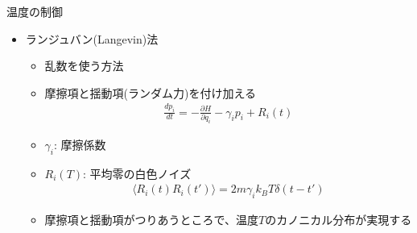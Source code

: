 
\begin{frame}[t,fragile]{温度の制御}
  \begin{itemize}
  \item ランジュバン(Langevin)法
    \begin{itemize}
    \item 乱数を使う方法
    \item 摩擦項と揺動項(ランダム力)を付け加える
      \begin{align*}
        \frac{dp_i}{dt} = - \frac{\partial H}{\partial q_i} - \gamma_i p_i + R_i(t)
      \end{align*}
    \item $\gamma_i$: 摩擦係数
    \item $R_i(T)$: 平均零の白色ノイズ
      \begin{align*}
        \langle R_i(t) R_i(t') \rangle = 2 m \gamma_i k_B T \delta(t-t')
      \end{align*}
    \item 摩擦項と揺動項がつりあうところで、温度$T$のカノニカル分布が実現する
    \end{itemize}
  \end{itemize}
\end{frame}

